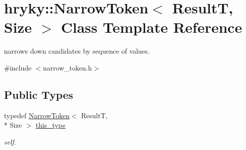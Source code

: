 \hypertarget{classhryky_1_1_narrow_token}{\section{hryky\-:\-:Narrow\-Token$<$ Result\-T, Size $>$ Class Template Reference}
\label{classhryky_1_1_narrow_token}
}


narrows down candidates by sequence of values.  




{\ttfamily \#include $<$narrow\-\_\-token.\-h$>$}

\subsection*{Public Types}
\begin{DoxyCompactItemize}
\item 
\hypertarget{classhryky_1_1_narrow_token_a8ef24a463e656c6201d12dc48d566c58}{typedef \hyperlink{classhryky_1_1_narrow_token}{Narrow\-Token}$<$ Result\-T, \\*
Size $>$ \hyperlink{classhryky_1_1_narrow_token_a8ef24a463e656c6201d12dc48d566c58}{this\-\_\-type}}\label{classhryky_1_1_narrow_token_a8ef24a463e656c6201d12dc48d566c58}

\begin{DoxyCompactList}\small\item\em self. \end{DoxyCompactList}\end{DoxyCompactItemize}
